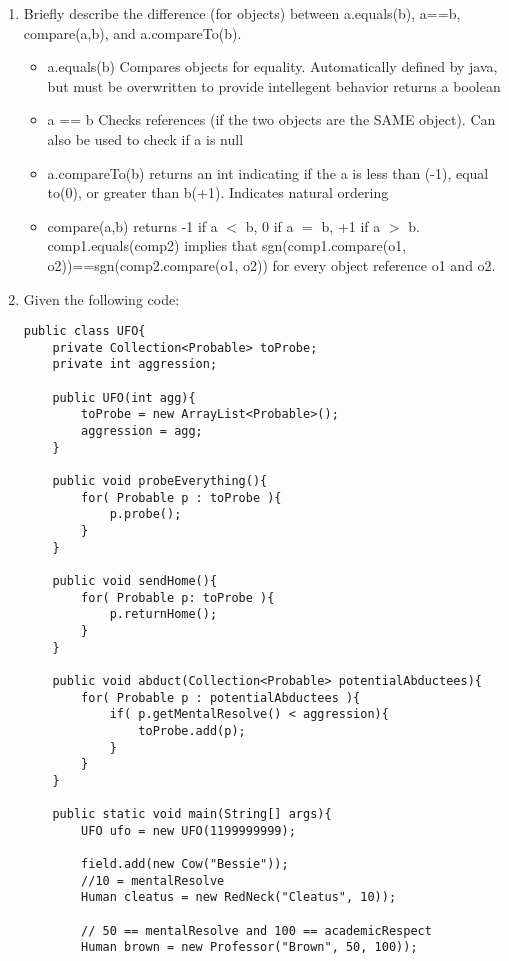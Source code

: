 \documentclass[11pt]{article}
\newenvironment{answer}{\large\lstset{basicstyle=\large}\color{white}}{}
\newenvironment{answer}{\large\lstset{basicstyle=\large}\color{red}}{}
\begin{document}
\begin{enumerate}
\item Briefly describe the difference (for objects) between a.equals(b), a==b, compare(a,b), and a.compareTo(b).
\begin{answer}
    \begin{itemize}
        \item a.equals(b) Compares objects for equality. Automatically defined by java, but must be overwritten
to provide intellegent behavior returns a boolean
    \item a == b  Checks references (if the two objects are the SAME object). Can also be used to check if a is null  
    \item a.compareTo(b) returns an int indicating if the a is less than (-1), equal to(0), or greater than b(+1). Indicates natural ordering 
    \item compare(a,b) returns -1 if a $<$ b, 0 if a $=$ b, +1 if a $>$ b. comp1.equals(comp2) implies that sgn(comp1.compare(o1, o2))==sgn(comp2.compare(o1, o2)) for every object reference o1 and o2.
    \end{itemize}
\end{answer}


\item Given the following code:
\begin{lstlisting}
public class UFO{
    private Collection<Probable> toProbe;
    private int aggression;

    public UFO(int agg){
        toProbe = new ArrayList<Probable>();
        aggression = agg;
    }

    public void probeEverything(){
        for( Probable p : toProbe ){
            p.probe();
        }
    }

    public void sendHome(){
        for( Probable p: toProbe ){
            p.returnHome();
        }
    }

    public void abduct(Collection<Probable> potentialAbductees){
        for( Probable p : potentialAbductees ){
            if( p.getMentalResolve() < aggression){
                toProbe.add(p);
            }
        }
    }

    public static void main(String[] args){
        UFO ufo = new UFO(1199999999);

        field.add(new Cow("Bessie"));
        //10 = mentalResolve
        Human cleatus = new RedNeck("Cleatus", 10));
        
        // 50 == mentalResolve and 100 == academicRespect
        Human brown = new Professor("Brown", 50, 100));         
        

\end{lstlisting}
\end{enumerate}
\end{document}
